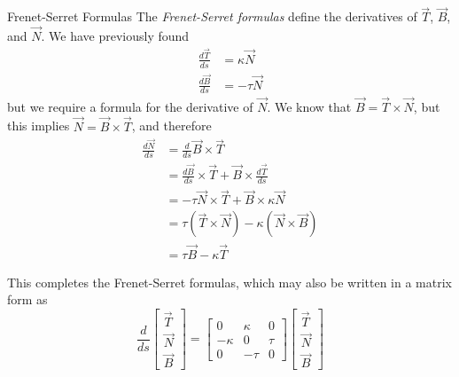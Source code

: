 \documentclass[../main.tex]{subfiles}
\begin{document}
                \begin{definition}{Frenet-Serret Formulas}{}
                        The \emph{Frenet-Serret formulas} define the derivatives of \(\vec{T}\), \(\vec{B}\), and \(\vec{N}\). We have previously found
                        \begin{align*}
                                \frac{d\vec{T}}{ds}&=\kappa\vec{N}\\
                                \frac{d\vec{B}}{ds}&=-\tau\vec{N}
                        \end{align*}
                        but we require a formula for the derivative of \(\vec{N}\). We know that \(\vec{B}=\vec{T}\times\vec{N}\), but this implies \(\vec{N}=\vec{B}\times\vec{T}\), and therefore
                        \begin{align*}
                                \frac{d\vec{N}}{ds}&=\frac{d}{ds}\vec{B}\times\vec{T}\\
                                                   &=\frac{d\vec{B}}{ds}\times\vec{T}+\vec{B}\times\frac{d\vec{T}}{ds}\\
                                                   &=-\tau\vec{N}\times\vec{T}+\vec{B}\times\kappa\vec{N}\\
                                                   &=\tau(\vec{T}\times\vec{N})-\kappa(\vec{N}\times\vec{B})\\
                                                   &=\tau\vec{B}-\kappa\vec{T}
                        \end{align*}

                        This completes the Frenet-Serret formulas, which may also be written in a matrix form as
                        \[
                        \frac{d}{ds}
                        \begin{bmatrix}
                                \vec{T}\\
                                \vec{N}\\
                                \vec{B}
                        \end{bmatrix}=
                        \begin{bmatrix}
                                0&\kappa&0\\
                                -\kappa&0&\tau\\
                                0&-\tau&0
                        \end{bmatrix}
                        \begin{bmatrix}
                                \vec{T}\\
                                \vec{N}\\
                                \vec{B}
                        \end{bmatrix}
                        \]
                \end{definition}
\end{document}
